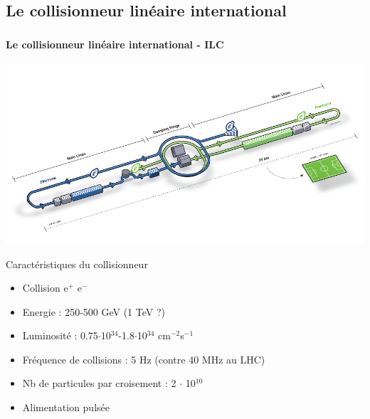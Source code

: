 \documentclass[8pt]{beamer}
\begin{document}
  \subsection{Le collisionneur linéaire international}

  \begin{frame}
  \frametitle{\secname}
  \framesubtitle{Le collisionneur linéaire international - ILC}
    \begin{center}
      \includegraphics[width=0.55\linewidth]{figs/ilc_layout.jpg}
    \end{center}
    \begin{minipage}{0.51\linewidth}
      \begin{block}{Caractéristiques du collisionneur}
        \begin{itemize}
          \item Collision e$^{+}$ e$^{-}$
          \item Energie : 250-500 GeV (1 TeV ?)
          \item Luminosité : 0.75$\cdot$10$^{34}$-1.8$\cdot$10$^{34}$ cm$^{-2}$s$^{-1}$
          \item Fréquence de collisions : 5 Hz (contre 40 MHz au LHC)
          \item Nb de particules par croisement : 2 $\cdot$ 10$^{10}$
          \item Alimentation pulsée
        \end{itemize}
      \end{block}
    \end{minipage} \hfill
    \begin{minipage}{0.46\linewidth}
\end{minipage}
\end{frame}
\end{document}

